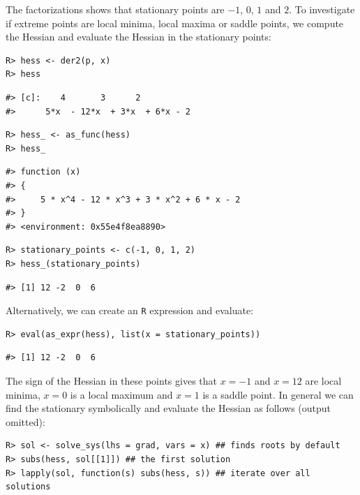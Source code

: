 The factorizations shows that stationary points are \(-1\), \(0\), \(1\) and \(2\). To
investigate if extreme points are local minima, local maxima or saddle
points, we compute the Hessian and evaluate the Hessian in the
stationary points:

\begin{verbatim}
R> hess <- der2(p, x)
R> hess
\end{verbatim}

\begin{verbatim}
#> [c]:    4       3      2          
#>      5*x  - 12*x  + 3*x  + 6*x - 2
\end{verbatim}

\begin{verbatim}
R> hess_ <- as_func(hess)
R> hess_
\end{verbatim}

\begin{verbatim}
#> function (x) 
#> {
#>     5 * x^4 - 12 * x^3 + 3 * x^2 + 6 * x - 2
#> }
#> <environment: 0x55e4f8ea8890>
\end{verbatim}

\begin{verbatim}
R> stationary_points <- c(-1, 0, 1, 2)
R> hess_(stationary_points)
\end{verbatim}

\begin{verbatim}
#> [1] 12 -2  0  6
\end{verbatim}

Alternatively, we can create an \texttt{R} expression and evaluate:

\begin{verbatim}
R> eval(as_expr(hess), list(x = stationary_points))
\end{verbatim}

\begin{verbatim}
#> [1] 12 -2  0  6
\end{verbatim}

The sign of the Hessian in these points gives that \(x=-1\) and \(x=12\)
are local minima, \(x=0\) is a local maximum and \(x=1\) is a saddle
point.
In general we can find the stationary symbolically and evaluate the Hessian as follows (output omitted):

\begin{verbatim}
R> sol <- solve_sys(lhs = grad, vars = x) ## finds roots by default
R> subs(hess, sol[[1]]) ## the first solution
R> lapply(sol, function(s) subs(hess, s)) ## iterate over all solutions
\end{verbatim}

